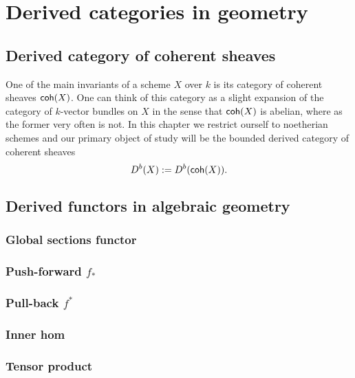 \section{Derived categories in geometry}

\subsection{Derived category of coherent sheaves}

One of the main invariants of a scheme $X$ over $k$ is its category of coherent sheaves $\textsf{coh}(X)$. One can think of this category as a slight expansion of the category of $k$-vector bundles on $X$ in the sense that $\textsf{coh}(X)$ is abelian, where as the former very often is not. In this chapter we restrict ourself to noetherian schemes and our primary object of study will be the bounded derived category of coherent sheaves
\[
    D^b(X) := D^b(\textsf{coh}(X)).
\]

\subsection{Derived functors in algebraic geometry}

\subsubsection{Global sections functor}
\subsubsection{Push-forward $f_*$}
\subsubsection{Pull-back $f^*$}
\subsubsection{Inner hom}
\subsubsection{Tensor product }
